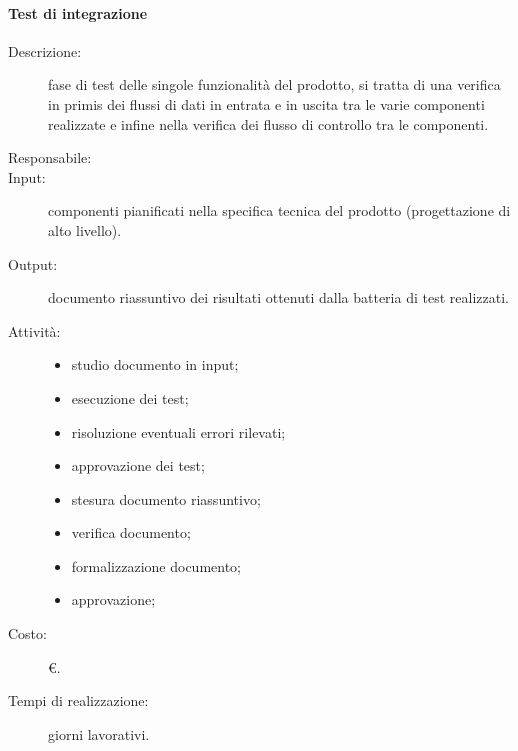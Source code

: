 \paragraph{Test di integrazione}
\begin{description}
\item[Descrizione:] fase di test delle singole funzionalità del prodotto, si tratta di una verifica in primis dei flussi di dati in entrata e in uscita tra le varie componenti realizzate e infine nella verifica dei flusso di controllo tra le componenti.
\item[Responsabile:] 
\item[Input:] componenti pianificati nella specifica tecnica del prodotto (progettazione di alto livello).
\item[Output:] documento riassuntivo dei risultati ottenuti dalla batteria di test realizzati.
\item[Attività:]
\begin{itemize}
\item studio documento in input;
\item esecuzione dei test;
\item risoluzione eventuali errori rilevati;
\item approvazione dei test;
\item stesura documento riassuntivo;
\item verifica documento;
\item formalizzazione documento;
\item approvazione;
\end{itemize}
\item[Costo:] \euro{}.
\item[Tempi di realizzazione:]  giorni lavorativi.
\end{description}

